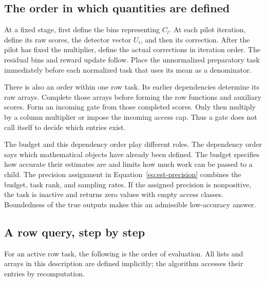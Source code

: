 \subsection{The order in which quantities are defined}

At a fixed stage, first define the bins representing $C_l$. At each pilot iteration, define its raw scores, the detector vector $U_i$, and then its correction. After the pilot has fixed the multiplier, define the actual corrections in iteration order. The residual bins and reward update follow. Place the unnormalized preparatory task immediately before each normalized task that uses its mean as a denominator.

There is also an order within one row task. Its earlier dependencies determine its raw arrays. Complete those arrays before forming the row functions and auxiliary scores. Form an incoming gate from those completed scores. Only then multiply by a column multiplier or impose the incoming access cap. Thus a gate does not call itself to decide which entries exist.

The budget and this dependency order play different roles. The dependency order says which mathematical objects have already been defined. The budget specifies how accurate their estimates are and limits how much work can be passed to a child. The precision assignment in Equation~\eqref{eq:est-precision} combines the budget, task rank, and sampling rates. If the assigned precision is nonpositive, the task is inactive and returns zero values with empty access classes. Boundedness of the true outputs makes this an admissible low-accuracy answer.

\subsection{A row query, step by step}

For an active row task, the following is the order of evaluation. All lists and arrays in this description are defined implicitly; the algorithm accesses their entries by recomputation.

